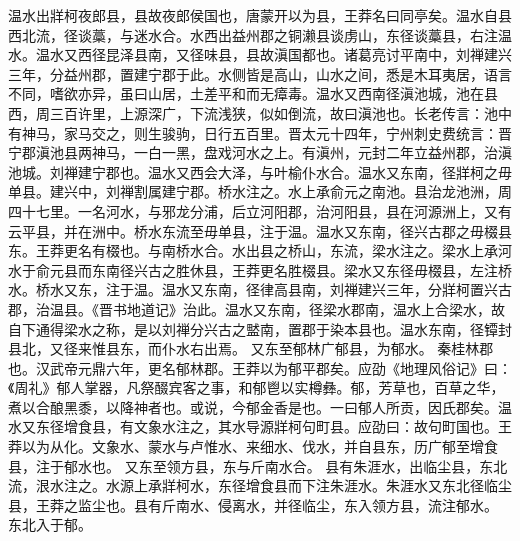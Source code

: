 \documentclass[12pt,UTF8]{ctexbook}
\begin{document}
温水出牂柯夜郎县，县故夜郎侯国也，唐蒙开以为县，王莽名曰同亭矣。温水自县西北流，径谈藁，与迷水合。水西出益州郡之铜濑县谈虏山，东径谈藁县，右注温水。温水又西径昆泽县南，又径味县，县故滇国都也。诸葛亮讨平南中，刘禅建兴三年，分益州郡，置建宁郡于此。水侧皆是高山，山水之间，悉是木耳夷居，语言不同，嗜欲亦异，虽曰山居，土差平和而无瘴毒。温水又西南径滇池城，池在县西，周三百许里，上源深广，下流浅狭，似如倒流，故曰滇池也。长老传言：池中有神马，家马交之，则生骏驹，日行五百里。晋太元十四年，宁州刺史费统言：晋宁郡滇池县两神马，一白一黑，盘戏河水之上。有滇州，元封二年立益州郡，治滇池城。刘禅建宁郡也。温水又西会大泽，与叶榆仆水合。温水又东南，径牂柯之毋单县。建兴中，刘禅割属建宁郡。桥水注之。水上承俞元之南池。县治龙池洲，周四十七里。一名河水，与邪龙分浦，后立河阳郡，治河阳县，县在河源洲上，又有云平县，并在洲中。桥水东流至毋单县，注于温。温水又东南，径兴古郡之毋棳县东。王莽更名有棳也。与南桥水合。水出县之桥山，东流，梁水注之。梁水上承河水于俞元县而东南径兴古之胜休县，王莽更名胜棳县。梁水又东径毋棳县，左注桥水。桥水又东，注于温。温水又东南，径律高县南，刘禅建兴三年，分牂柯置兴古郡，治温县。《晋书地道记》治此。温水又东南，径梁水郡南，温水上合梁水，故自下通得梁水之称，是以刘禅分兴古之盢南，置郡于染本县也。温水东南，径镡封县北，又径来惟县东，而仆水右出焉。
又东至郁林广郁县，为郁水。
秦桂林郡也。汉武帝元鼎六年，更名郁林郡。王莽以为郁平郡矣。应劭《地理风俗记》曰：《周礼》郁人掌器，凡祭醊宾客之事，和郁鬯以实樽彝。郁，芳草也，百草之华，煮以合酿黑黍，以降神者也。或说，今郁金香是也。一曰郁人所贡，因氏郡矣。温水又东径增食县，有文象水注之，其水导源牂柯句町县。应劭曰：故句町国也。王莽以为从化。文象水、蒙水与卢惟水、来细水、伐水，并自县东，历广郁至增食县，注于郁水也。
又东至领方县，东与斤南水合。
县有朱涯水，出临尘县，东北流，泿水注之。水源上承牂柯水，东径增食县而下注朱涯水。朱涯水又东北径临尘县，王莽之监尘也。县有斤南水、侵离水，并径临尘，东入领方县，流注郁水。
东北入于郁。
\end{document}
